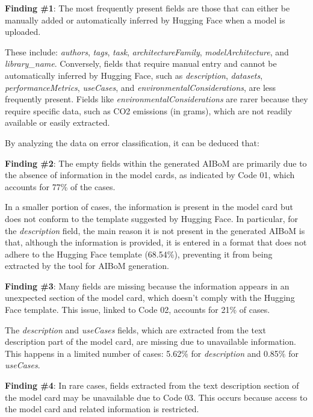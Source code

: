 \documentclass[12pt,a4paper, oneside, openright]{book}
\newcommand{\aibom}{{AIBoM}\xspace}
\begin{document}
\begin{mdframed}
    \textbf{Finding \#1}: The most frequently present fields are those that can either be manually added or automatically inferred by Hugging Face when a model is uploaded.
\end{mdframed}
These include: \textit{authors}, \textit{tags}, \textit{task}, \textit{architectureFamily}, \textit{modelArchitecture}, and \textit{library\_name}. Conversely, fields that require manual entry and cannot be automatically inferred by Hugging Face, such as \textit{description}, \textit{datasets}, \textit{performanceMetrics}, \textit{useCases}, and \textit{environmentalConsiderations}, are less frequently present. Fields like \textit{environmentalConsiderations} are rarer because they require specific data, such as CO2 emissions (in grams), which are not readily available or easily extracted.

By analyzing the data on error classification, it can be deduced that:
\begin{mdframed}
\textbf{Finding \#2}: The empty fields within the generated \aibom are primarily due to the absence of information in the model cards, as indicated by Code 01, which accounts for 77\% of the cases. 
\end{mdframed}
In a smaller portion of cases, the information is present in the model card but does not conform to the template suggested by Hugging Face. In particular, for the \textit{description} field, the main reason it is not present in the generated \aibom is that, although the information is provided, it is entered in a format that does not adhere to the Hugging Face template (68.54\%), preventing it from being extracted by the tool for \aibom generation.
\begin{mdframed}
\textbf{Finding \#3}: Many fields are missing because the information appears in an unexpected section of the model card, which doesn't comply with the Hugging Face template. This issue, linked to Code 02, accounts for 21\% of cases. 
\end{mdframed}
The \textit{description} and \textit{useCases} fields, which are extracted from the text description part of the model card, are missing due to unavailable information. This happens in a limited number of cases: 5.62\% for \textit{description} and 0.85\% for \textit{useCases}.
\begin{mdframed}
\textbf{Finding \#4}:  In rare cases, fields extracted from the text description section of the model card may be unavailable due to Code 03. This occurs because access to the model card and related information is restricted.
\end{mdframed}
\end{document}
